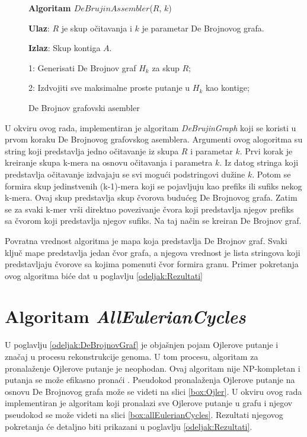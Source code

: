 \documentclass[12pt,oneside]{memoir}
\begin{document}
\begin{figure}[!ht]
\begin{tcolorbox}
\textbf{Algoritam $DeBrujinAssembler$}($R$, $k$)

\textbf{Ulaz}: $R$ je skup očitavanja i $k$ je parametar De Brojnovog grafa.

\textbf{Izlaz}: Skup kontiga $A$.

1: Generisati De Brojnov graf $H_k$ za skup $R$;

2: Izdvojiti sve maksimalne proste putanje u $H_k$ kao kontige;

\end{tcolorbox}
\caption{De Brojnov grafovski asembler \cite{WingKinSung}}
\label{box:DeBrujinAssembler}
\end{figure}

U okviru ovog rada, implementiran je algoritam \textit{DeBrujinGraph} koji se koristi u prvom koraku De Brojnovog grafovskog asemblera. Argumenti ovog alogoritma su string koji predstavlja jedno očitavanje iz skupa $R$ i parametar $k$. Prvi korak je kreiranje skupa k-mera na osnovu očitavanja i parametra $k$. Iz datog stringa koji predstavlja očitavanje izdvajaju se svi mogući podstringovi dužine $k$. Potom se formira skup jedinstvenih (k-1)-mera koji se pojavljuju kao prefiks ili sufiks nekog k-mera. Ovaj skup predstavlja skup čvorova budućeg De Brojnovog grafa. Zatim se za svaki k-mer vrši direktno povezivanje čvora koji predstavlja njegov prefiks sa čvorom koji predstavlja njegov sufiks. Na taj način se kreiran De Brojnov graf.

Povratna vrednost algoritma je mapa koja predstavlja De Brojnov graf. Svaki ključ mape predstavlja jedan čvor grafa, a njegova vrednost je lista stringova koji predstavljaju čvorove sa kojima pomenuti čvor formira granu. Primer pokretanja ovog algoritma biće dat u poglavlju \ref{odeljak:Rezultati}

\section{Algoritam \textit{AllEulerianCycles}}

U poglavlju \ref{odeljak:DeBrojnovGraf} je objašnjen pojam  Ojlerove putanje i značaj u procesu rekonstrukcije genoma. U tom procesu, algoritam za pronalaženje Ojlerove putanje je neophodan. Ovaj algoritam nije NP-kompletan i putanja se može efikasno pronaći \cite{skriptaBio}. Pseudokod pronalaženja Ojlerove putanje na osnovu De Brojnovog grafa može se videti na slici \ref{box:Ojler}. U okviru ovog rada implementiran je algoritam koji pronalazi sve Ojlerove putanje u grafu i njegov pseudokod se može videti na slici \ref{box:allEulerianCycles}. Rezultati njegovog pokretanja će detaljno biti prikazani u poglavlju \ref{odeljak:Rezultati}.
\vspace{0.2cm}
\end{document}
